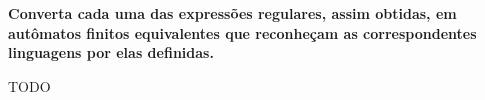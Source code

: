 
\textbf{Converta cada uma das expressões regulares, assim obtidas, em autômatos finitos equivalentes que reconheçam as correspondentes linguagens por elas definidas.}

TODO
